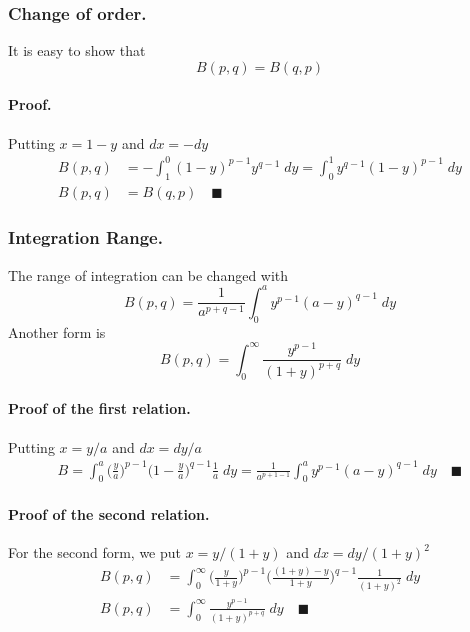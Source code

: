 \documentclass[../../main.tex]{subfiles}
\begin{document}
\subsubsection{Change of order.} It is easy to show that
\begin{equation*}
    B(p,q)=B(q,p)
\end{equation*}

\paragraph{Proof.} Putting $x=1-y$ and $dx=-dy$
\begin{align*}
    B(p,q)&=-\int_{1}^{0}(1-y)^{p-1}y^{q-1}\;dy= \int_{0 }^{1}y^{q-1}(1-y)^{p-1}\;dy\\
    B(p,q)&=B(q,p)\quad\blacksquare
\end{align*}

\subsubsection{Integration Range.} The range of integration can be changed with 
\begin{equation*}
    B(p,q)=\frac{1}{a^{p+q-1}}  \int_{0}^{a} y^{p-1}(a-y)^{q-1}\;dy 
\end{equation*}
Another form is
\begin{equation*}
    B(p,q)=\int_{0}^{\infty}\frac{y^{p-1}}{(1+y)^{p+q}}\;dy
\end{equation*}

\paragraph{Proof of the first relation.} Putting $x = y/a$ and $dx=dy/a$
\begin{align*}
    B=\int_{0}^{a}\big(\frac{y}{a}\big)^{p-1}\big(1-\frac{y}{a}\big)^{q-1}\frac{1}{a}\;dy=\frac{1}{a^{p+1-1}}  \int_{0}^{a} y^{p-1}(a-y)^{q-1}\;dy \quad\blacksquare
\end{align*}

\paragraph{Proof of the second relation.} For the second form, we put $x = y/(1 + y)$ and $dx=dy/(1+y)^2$
\begin{align*}
    B(p,q)&=\int_{0}^{\infty}\bigg(\frac{y}{1+y} \bigg)^{p-1} \bigg(\frac{(1+y)-y}{1+y}\bigg)^{q-1}\frac{1}{(1+y)^2}\;dy\\
    B(p,q)&=\int_{0}^{\infty}\frac{y^{p-1}}{(1+y)^{p+q}}\;dy\quad\blacksquare
\end{align*}
\end{document}
